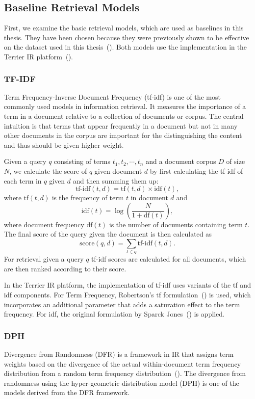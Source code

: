\subsection{Baseline Retrieval Models}\label{sec:baseline-retrieval-models}
First, we examine the basic retrieval models, which are used as baselines in this thesis.
They have been chosen because they were previously shown to be effective on the dataset used in this thesis~(\cite{goeuriot:2021:Consumer}).
Both models use the implementation in the Terrier IR platform~(\cite{ounis:2005:Terrier}).

\subsubsection{TF-IDF}\label{sec:tf-idf}
Term Frequency-Inverse Document Frequency (tf-idf) is one of the most commonly used models in information retrieval.
It measures the importance of a term in a document relative to a collection of documents or corpus.
The central intuition is that terms that appear frequently in a document but not in many other documents in the corpus are important for the distinguishing the content and thus should be given higher weight.

Given a query \( q \) consisting of terms \( t_1,t_2,\cdots,t_n \) and a document corpus \( D \) of size \( N \), we calculate the score of \( q \) given document \( d \) by first calculating the tf-idf of each term  in \( q \) given \( d \) and then summing them up:
\[ \text{tf-idf}(t, d) = \text{tf}(t, d) \times \text{idf}(t) ,\]
where \( \text{tf}(t, d) \) is the frequency of term \( t \) in document \( d \) and 
\[ \text{idf}(t) = \log \left( \frac{N}{1 + \text{df}(t)} \right), \]
where document frequency \( \text{df}(t) \) is the number of documents containing term \( t \).
The final score of the query given the document is then calculated as
\[ \text{score}(q, d) = \sum_{t \in q} \text{tf-idf}(t, d) .\]
For retrieval given a query \( q \) tf-idf scores are calculated for all documents, which are then ranked according to their score.

In the Terrier IR platform, the implementation of tf-idf uses variants of the tf and idf components.
For Term Frequency, Robertson's tf formulation~(\cite{robertson:2004:Understanding}) is used, which incorporates an additional parameter that adds a saturation effect to the term frequency.
For idf, the original formulation by Sparck Jones~(\cite{sparck:1972:A}) is applied.

\subsubsection{DPH}\label{sec:dph}
Divergence from Randomness (DFR) is a framework in IR that assigns term weights based on the divergence of the actual within-document term frequency distribution from a random term frequency distribution~(\cite{amati:2006:Frequentist}).
The divergence from randomness using the hyper-geometric distribution model (DPH) is one of the models derived from the DFR framework.

